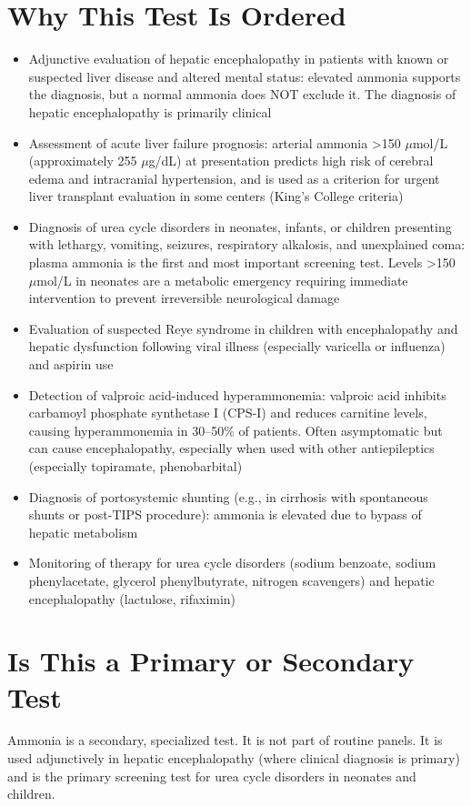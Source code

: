 \section*{Why This Test Is Ordered}
\begin{itemize}
  \item Adjunctive evaluation of hepatic encephalopathy in patients with known or suspected liver disease and altered mental status: elevated ammonia supports the diagnosis, but a normal ammonia does NOT exclude it. The diagnosis of hepatic encephalopathy is primarily clinical
  \item Assessment of acute liver failure prognosis: arterial ammonia >150 $\mu$mol/L (approximately 255 $\mu$g/dL) at presentation predicts high risk of cerebral edema and intracranial hypertension, and is used as a criterion for urgent liver transplant evaluation in some centers (King's College criteria)
  \item Diagnosis of urea cycle disorders in neonates, infants, or children presenting with lethargy, vomiting, seizures, respiratory alkalosis, and unexplained coma: plasma ammonia is the first and most important screening test. Levels >150 $\mu$mol/L in neonates are a metabolic emergency requiring immediate intervention to prevent irreversible neurological damage
  \item Evaluation of suspected Reye syndrome in children with encephalopathy and hepatic dysfunction following viral illness (especially varicella or influenza) and aspirin use
  \item Detection of valproic acid-induced hyperammonemia: valproic acid inhibits carbamoyl phosphate synthetase I (CPS-I) and reduces carnitine levels, causing hyperammonemia in 30--50\% of patients. Often asymptomatic but can cause encephalopathy, especially when used with other antiepileptics (especially topiramate, phenobarbital)
  \item Diagnosis of portosystemic shunting (e.g., in cirrhosis with spontaneous shunts or post-TIPS procedure): ammonia is elevated due to bypass of hepatic metabolism
  \item Monitoring of therapy for urea cycle disorders (sodium benzoate, sodium phenylacetate, glycerol phenylbutyrate, nitrogen scavengers) and hepatic encephalopathy (lactulose, rifaximin)
\end{itemize}

\section*{Is This a Primary or Secondary Test}
Ammonia is a secondary, specialized test. It is not part of routine panels. It is used adjunctively in hepatic encephalopathy (where clinical diagnosis is primary) and is the primary screening test for urea cycle disorders in neonates and children.

